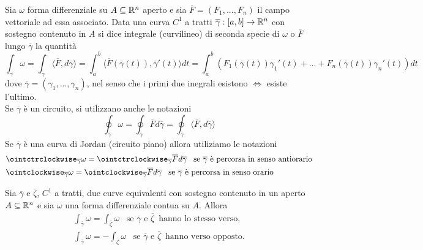 \begin{definition}
	Sia $\omega$ forma differenziale su $A \subseteq \mathbb{R}^n$ aperto e sia $\overline{F}=(F_1,...,F_n)$ il campo vettoriale ad essa associato. Data una curva $C^1$ a tratti $\overline{\gamma} :[a,b]\rightarrow \mathbb{R}^n$ con sostegno contenuto in $A$ si dice integrale (curvilineo) di seconda specie di $\omega$ o $\overline{F}$ lungo $\overline{\gamma}$ la quantità
	\begin{equation*}
		\int_{\overline{\gamma}}\omega = \int_{\overline{\gamma}}\langle \overline{F},d\overline{\gamma} \rangle = \int_a^b \langle \overline{F}(\overline{\gamma}(t)),\overline{\gamma}'(t) \rangle dt=\int_a^b (F_1 (\overline{\gamma}(t))\gamma_1'(t)+...+F_n(\overline{\gamma}(t))\gamma_n'(t))dt
	\end{equation*}
	dove $\overline{\gamma}=(\gamma_1,...,\gamma_n)$, nel senso che i primi due inegrali esistono $\Leftrightarrow $ esiste l'ultimo.\\
	Se $\overline{\gamma} $ è un circuito, si utilizzano anche le notazioni
	\begin{equation*}
		\oint_{\overline{\gamma}} \omega= \oint_{\overline{\gamma}} \overline{F} d\overline{\gamma} = \oint_{\overline{\gamma}}\langle \overline{F},d\overline{\gamma} \rangle
	\end{equation*}
	Se $\overline{\gamma}$ è una curva di Jordan (circuito piano) allora utiliziamo le notazioni
	\begin{align*}
		&\ointctrclockwise_{\overline{\gamma}} \omega=\ointctrclockwise_{\overline{\gamma}}\overline{F}d\overline{\gamma}\,\,\,\,\, \text{se} \,\, \overline{\gamma}\,\, \text{è percorsa in senso antiorario} \\
		&\ointclockwise_{\overline{\gamma}}\omega=\ointclockwise_{\overline{\gamma}}\overline{F}d\overline{\gamma} \,\,\,\,\, \text{se} \,\, \overline{\gamma}\,\, \text{è percorsa in senso orario}
	\end{align*}
\end{definition}


\begin{theorem}
	
	\label{th: pag 455}
	Sia $\overline{\gamma}$ e $\overline{\zeta}$, $C^1$ a tratti, due curve equivalenti  con sostegno contenuto in un aperto $A \subseteq \mathbb{R}^n$ e sia $\omega$ una forma differenziale contua su $A$. Allora
	\begin{align*}
		\int_{\overline{\gamma}} \omega= \int_{\overline{\zeta}} \omega
		\,\,\,\,\,\text{se}\,\, \overline{\gamma}\,\, \text{e}\,\,\overline{\zeta}\,\,\, \text{hanno lo stesso verso,}\\
		\int_{\overline{\gamma}}\omega= -\int_{\overline{\zeta}} \omega 
		\,\,\,\,\,\text{se} \,\,\overline{\gamma} \,\, \text{e}\,\,\overline{\zeta} \,\,\,\text{hanno verso opposto.}
	\end{align*}
\end{theorem}


